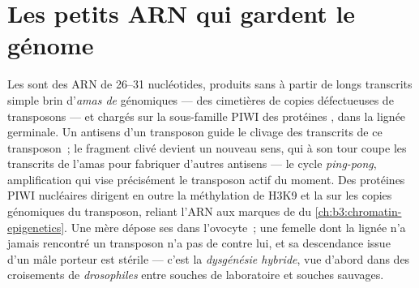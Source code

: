 \section{Les petits ARN qui gardent le génome}

\begin{definition}\label{def:b3:rna-regulation:pirna}
Les \emph{} sont des ARN de \numrange{26}{31} nucléotides,
produits sans  à partir de longs transcrits simple brin d'\emph{amas
de } génomiques --- des cimetières de copies défectueuses de
transposons --- et chargés sur la sous-famille PIWI des protéines
, dans la lignée germinale. Un  antisens d'un transposon
guide le clivage des transcrits de ce transposon~; le fragment clivé
devient un nouveau  sens, qui à son tour coupe les transcrits de
l'amas pour fabriquer d'autres  antisens --- le cycle
\emph{ping-pong}, amplification qui vise précisément le transposon
actif du moment. Des protéines PIWI nucléaires dirigent en outre la
méthylation de H3K9 et la  sur les copies
génomiques du transposon, reliant l'ARN aux marques de  du
\cref{ch:b3:chromatin-epigenetics}. Une mère dépose ses  dans
l'ovocyte~; une femelle dont la lignée n'a jamais rencontré un
transposon n'a pas de  contre lui, et sa descendance issue d'un
mâle porteur est stérile --- c'est la \emph{dysgénésie hybride}, vue
d'abord dans des croisements de \emph{drosophiles} entre souches de
laboratoire et souches sauvages.
\end{definition}

